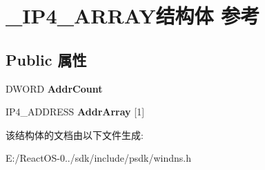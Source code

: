 \hypertarget{struct___i_p4___a_r_r_a_y}{}\section{\+\_\+\+I\+P4\+\_\+\+A\+R\+R\+A\+Y结构体 参考}
\label{struct___i_p4___a_r_r_a_y}
\subsection*{Public 属性}
\begin{DoxyCompactItemize}
\item 
\mbox{\label{struct___i_p4___a_r_r_a_y_ad8c5bf3a4cc96a0e8a2ec86901a4c945}} 
D\+W\+O\+RD {\bfseries Addr\+Count}
\item 
\mbox{\label{struct___i_p4___a_r_r_a_y_aca41d2f3074797f09c83c1e107605f97}} 
I\+P4\+\_\+\+A\+D\+D\+R\+E\+SS {\bfseries Addr\+Array} \mbox{[}1\mbox{]}
\end{DoxyCompactItemize}


该结构体的文档由以下文件生成\+:\begin{DoxyCompactItemize}
\item 
E\+:/\+React\+O\+S-\/0../sdk/include/psdk/windns.\+h\end{DoxyCompactItemize}
